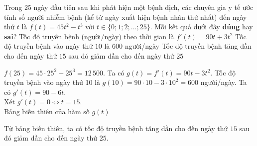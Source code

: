 \begin{ex}%
%
	Trong $25$ ngày đầu tiên sau khi phát hiện một bệnh dịch, các chuyên gia y tế ước tính số người nhiễm bệnh (kể từ ngày xuất hiện bệnh nhân thứ nhất) đến ngày thứ $t$ là $f(t)=45t^2-t^3$ với $t\in\{0;1;2;\ldots;25\}$.
	Mỗi kết quả dưới đây \textbf{đúng} hay \textbf{sai}?
	{Tốc độ truyền bệnh (người/ngày) theo thời gian là $f'(t)=90t+3t^2$}
	{\True Tốc độ truyền bệnh vào ngày thứ $10$ là $600$ người/ngày}
	{\True Tốc độ truyền bệnh tăng dần cho đến ngày thứ $15$ sau đó giảm dần cho đến ngày thứ $25$}
	\loigiai
	{
		\begin{itemchoice}
			\itemch $f(25)=45\cdot 25^2-25^3=12\,500$.
			\itemch Ta có $g(t)=f'(t)=90t-3t^2$. 
			\itemch Tốc độ truyền bệnh vào ngày thứ 10 là $g(10)=90\cdot 10-3\cdot 10^2=600$ người/ngày.
			\itemch Ta có $g'(t)=90-6t$. \\
			Xét $g'(t)=0 \Leftrightarrow t=15$. \\
			Bảng biến thiên của hàm số $g(t)$
			\begin{center}
			\end{center}
			Từ bảng biến thiên, ta có tốc độ truyền bệnh tăng dần cho đến ngày thứ $15$ sau đó giảm dần cho đến ngày thứ $25$.
		\end{itemchoice}
	}
\end{ex}

